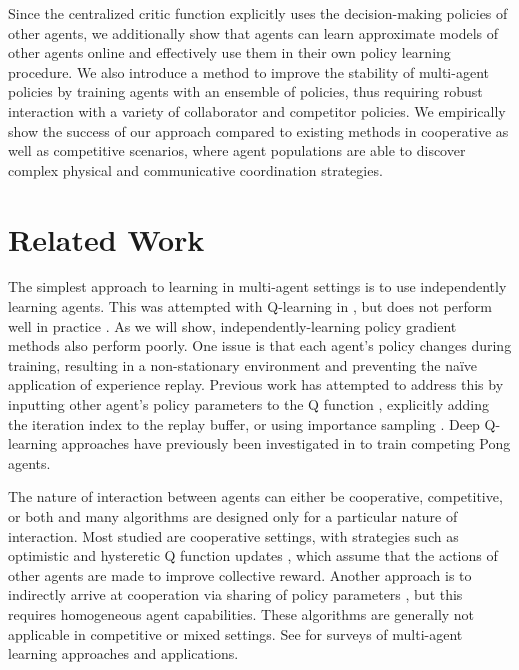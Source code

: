 \documentclass{article}
\begin{document}
Since the centralized critic function explicitly uses the decision-making policies of other agents, we additionally show that agents can learn approximate models of other agents online and effectively use them in their own policy learning procedure. We also introduce a method to improve the stability of multi-agent policies by training agents with an ensemble of policies, thus requiring robust interaction with a variety of collaborator and competitor policies. 
We empirically show the success of our approach compared to existing methods in cooperative as well as competitive scenarios, where agent populations are able to discover complex physical and communicative coordination strategies.

\section{Related Work}
\vspace{-2mm}


The simplest approach to learning in multi-agent settings is to use independently learning agents. This was attempted with Q-learning in \cite{tan93multi}, but does not perform well in practice \cite{matignon12independent}. As we will show, independently-learning policy gradient methods also perform poorly. 
One issue is that each agent's policy changes during training, resulting in a non-stationary environment and preventing the na{\"i}ve application of experience replay. 
Previous work has attempted to address this by inputting other agent’s policy parameters to the Q function \cite{hyper_q}, explicitly adding the iteration index to the replay buffer, or using importance sampling \cite{foerster_nonstat}. Deep Q-learning approaches have previously been investigated in \cite{tampuu2017multiagent} to train competing Pong agents.


The nature of interaction between agents can either be cooperative, competitive, or both and many algorithms are designed only for a particular nature of interaction. Most studied are cooperative settings, with strategies such as optimistic and hysteretic Q function updates \cite{lauer00distributed,hyst07,hyst17}, which assume that the actions of other agents are made to improve collective reward. Another approach is to indirectly arrive at cooperation via sharing of policy parameters \cite{gupta17cooperative}, but this requires homogeneous agent capabilities. These algorithms are generally not applicable in competitive or mixed settings. See \cite{panait05,busoniu2008comprehensive} for surveys of multi-agent learning approaches and applications.
\end{document}
